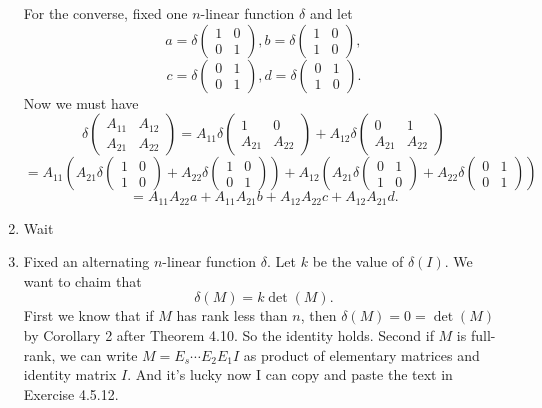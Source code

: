 \begin{enumerate}
For the converse, fixed one $n$-linear function $\delta $ and let 
\[a=\delta\begin{pmatrix}1&0\\0&1\end{pmatrix},b=\delta\begin{pmatrix}1&0\\1&0\end{pmatrix},\]
\[c=\delta\begin{pmatrix}0&1\\0&1\end{pmatrix},d=\delta\begin{pmatrix}0&1\\1&0\end{pmatrix}.\]
Now we must have 
\[\delta\begin{pmatrix}A_{11}&A_{12}\\A_{21}&A_{22}\end{pmatrix}=A_{11}\delta\begin{pmatrix}1&0\\A_{21}&A_{22}\end{pmatrix}+A_{12}\delta\begin{pmatrix}0&1\\A_{21}&A_{22}\end{pmatrix}\]
\[=A_{11}(A_{21}\delta\begin{pmatrix}1&0\\1&0\end{pmatrix}+A_{22}\delta\begin{pmatrix}1&0\\0&1\end{pmatrix})+A_{12}(A_{21}\delta\begin{pmatrix}0&1\\1&0\end{pmatrix}+A_{22}\delta\begin{pmatrix}0&1\\0&1\end{pmatrix})\]
\[=A_{11}A_{22}a+A_{11}A_{21}b+A_{12}A_{22}c+A_{12}A_{21}d.\]
\item Wait~
\item Fixed an alternating $n$-linear function $\delta $. Let $k$ be the value of $\delta(I)$. We want to chaim that 
\[\delta(M)=k\det(M).\]
First we know that if $M$ has rank less than $n$, then $\delta(M)=0=\det(M)$ by Corollary 2 after Theorem 4.10. So the identity holds. Second if $M$ is full-rank, we can write $M=E_s\cdots E_2E_1I$ as product of elementary matrices and identity matrix $I$. And it's lucky now I can copy and paste the text in Exercise 4.5.12. 


\end{enumerate}
